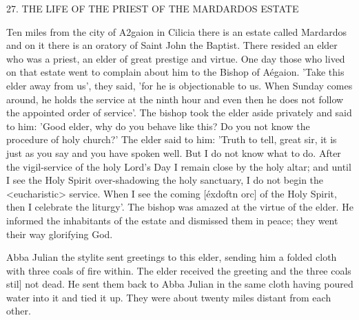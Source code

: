27. THE LIFE OF THE PRIEST OF THE
MARDARDOS ESTATE

Ten miles from the city of A2gaion in Cilicia there is an estate called
Mardardos and on it there is an oratory of Saint John the Baptist.
There resided an elder who was a priest, an elder of great prestige
and virtue. One day those who lived on that estate went to complain
about him to the Bishop of Aégaion. 'Take this elder away from us',
they said, 'for he is objectionable to us. When Sunday comes
around, he holds the service at the ninth hour and even then he
does not follow the appointed order of service'. The bishop took the
elder aside privately and said to him: 'Good elder, why do you
behave like this? Do you not know the procedure of holy church?'
The elder said to him: 'Truth to tell, great sir, it is just as you say
and you have spoken well. But I do not know what to do. After the
vigil-service of the holy Lord's Day I remain close by the holy altar;
and until I see the Holy Spirit over-shadowing the holy sanctuary,
I do not begin the <eucharistic> service. When I see the coming
[éxdoftn orc] of the Holy Spirit, then I celebrate the liturgy'.
The bishop was amazed at the virtue of the elder. He informed the
inhabitants of the estate and dismissed them in peace; they went
their way glorifying God.

Abba Julian the stylite sent greetings to this elder, sending him
a folded cloth with three coals of fire within. The elder received the
greeting and the three coals stil] not dead. He sent them back to
Abba Julian in the same cloth having poured water into it and tied
it up. They were about twenty miles distant from each other.

